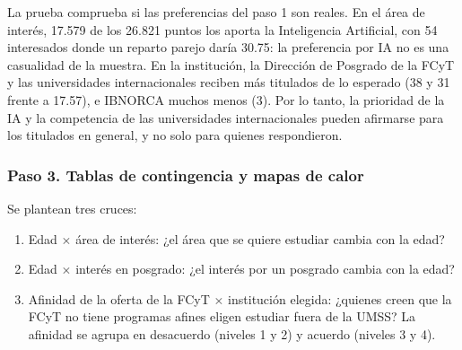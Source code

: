 \documentclass[12pt, a4paper]{article}
\begin{document}
La prueba comprueba si las preferencias del paso 1 son reales. En el área
de interés, 17.579 de los 26.821 puntos los aporta la Inteligencia
Artificial, con 54 interesados donde un reparto parejo daría 30.75: la
preferencia por IA no es una casualidad de la muestra. En la institución,
la Dirección de Posgrado de la FCyT y las universidades internacionales
reciben más titulados de lo esperado (38 y 31 frente a 17.57), e IBNORCA
muchos menos (3). Por lo tanto, la prioridad de la IA y la competencia de
las universidades internacionales pueden afirmarse para los titulados en
general, y no solo para quienes respondieron.

\subsubsection{Paso 3. Tablas de contingencia y mapas de calor}

Se plantean tres cruces:

\begin{enumerate}
  \item Edad $\times$ área de interés: ¿el área que se quiere estudiar
  cambia con la edad?
  \item Edad $\times$ interés en posgrado: ¿el interés por un posgrado
  cambia con la edad?
  \item Afinidad de la oferta de la FCyT $\times$ institución elegida:
  ¿quienes creen que la FCyT no tiene programas afines eligen estudiar
  fuera de la UMSS? La afinidad se agrupa en desacuerdo (niveles 1 y 2) y
  acuerdo (niveles 3 y 4).
\end{enumerate}
\end{document}
